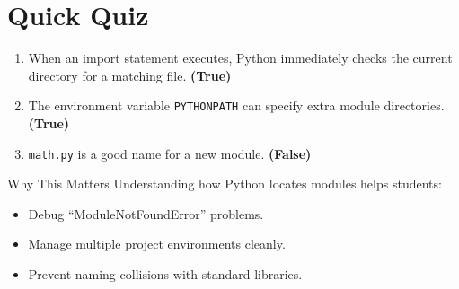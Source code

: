 \documentclass[12pt]{article}
\begin{document}
\section{Quick Quiz}
\begin{enumerate}
  \item When an import statement executes, Python immediately checks the current directory for a matching file. \textbf{(True)}  
  \item The environment variable \texttt{PYTHONPATH} can specify extra module directories. \textbf{(True)}  
  \item \texttt{math.py} is a good name for a new module. \textbf{(False)}  
\end{enumerate}

\begin{reflectionbox}{Why This Matters}
Understanding how Python locates modules helps students:
\begin{itemize}
  \item Debug ``ModuleNotFoundError'' problems.
  \item Manage multiple project environments cleanly.
  \item Prevent naming collisions with standard libraries.
\end{itemize}
\end{reflectionbox}

\end{document}
